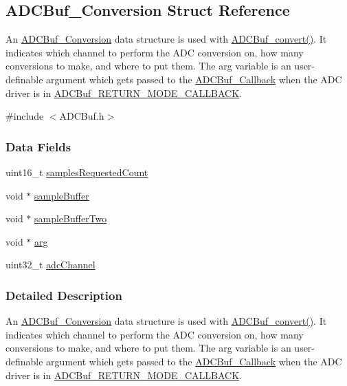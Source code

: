 \subsection{A\+D\+C\+Buf\+\_\+\+Conversion Struct Reference}
\label{struct_a_d_c_buf___conversion}


An \hyperlink{struct_a_d_c_buf___conversion}{A\+D\+C\+Buf\+\_\+\+Conversion} data structure is used with \hyperlink{_a_d_c_buf_8h_a762253a94875258c5a71b591f03f9d97}{A\+D\+C\+Buf\+\_\+convert()}. It indicates which channel to perform the A\+D\+C conversion on, how many conversions to make, and where to put them. The arg variable is an user-\/definable argument which gets passed to the \hyperlink{_a_d_c_buf_8h_a477c377c65f8de04aa67ff7eefa0a4cf}{A\+D\+C\+Buf\+\_\+\+Callback} when the A\+D\+C driver is in \hyperlink{_a_d_c_buf_8h_a3d643e8024503c5ef2679c83419ba6eea633b4b063b88d7c62e9e2513075a36a7}{A\+D\+C\+Buf\+\_\+\+R\+E\+T\+U\+R\+N\+\_\+\+M\+O\+D\+E\+\_\+\+C\+A\+L\+L\+B\+A\+C\+K}.  




{\ttfamily \#include $<$A\+D\+C\+Buf.\+h$>$}

\subsubsection*{Data Fields}
\begin{DoxyCompactItemize}
\item 
uint16\+\_\+t \hyperlink{struct_a_d_c_buf___conversion_afd95c203d1e7dd347102eef22dc9cc93}{samples\+Requested\+Count}
\item 
void $\ast$ \hyperlink{struct_a_d_c_buf___conversion_a5415e58a69e40124f66cdcc52a097c4a}{sample\+Buffer}
\item 
void $\ast$ \hyperlink{struct_a_d_c_buf___conversion_a6953e200ba2e5a85b9197bdaeb101a5f}{sample\+Buffer\+Two}
\item 
void $\ast$ \hyperlink{struct_a_d_c_buf___conversion_a47080bd2e4d552858be60f6e25be58dc}{arg}
\item 
uint32\+\_\+t \hyperlink{struct_a_d_c_buf___conversion_a379de126469bdd35de64c36498fafb51}{adc\+Channel}
\end{DoxyCompactItemize}


\subsubsection{Detailed Description}
An \hyperlink{struct_a_d_c_buf___conversion}{A\+D\+C\+Buf\+\_\+\+Conversion} data structure is used with \hyperlink{_a_d_c_buf_8h_a762253a94875258c5a71b591f03f9d97}{A\+D\+C\+Buf\+\_\+convert()}. It indicates which channel to perform the A\+D\+C conversion on, how many conversions to make, and where to put them. The arg variable is an user-\/definable argument which gets passed to the \hyperlink{_a_d_c_buf_8h_a477c377c65f8de04aa67ff7eefa0a4cf}{A\+D\+C\+Buf\+\_\+\+Callback} when the A\+D\+C driver is in \hyperlink{_a_d_c_buf_8h_a3d643e8024503c5ef2679c83419ba6eea633b4b063b88d7c62e9e2513075a36a7}{A\+D\+C\+Buf\+\_\+\+R\+E\+T\+U\+R\+N\+\_\+\+M\+O\+D\+E\+\_\+\+C\+A\+L\+L\+B\+A\+C\+K}. 

